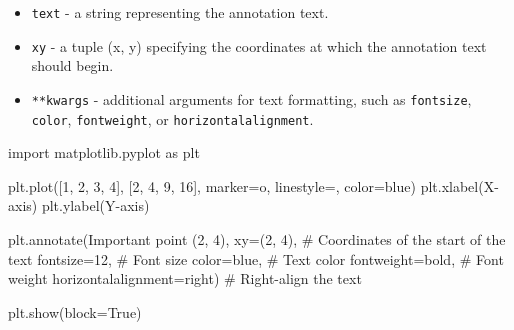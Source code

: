 \documentclass[
  english,
  letterpaper,
  DIV=11,
  numbers=noendperiod]{scrreprt}
\newenvironment{Shaded}{\begin{snugshade}}{\end{snugshade}}
\newcommand{\CommentTok}[1]{\textcolor[rgb]{0.37,0.37,0.37}{#1}}
\newcommand{\DecValTok}[1]{\textcolor[rgb]{0.68,0.00,0.00}{#1}}
\newcommand{\ImportTok}[1]{\textcolor[rgb]{0.00,0.46,0.62}{#1}}
\newcommand{\NormalTok}[1]{\textcolor[rgb]{0.00,0.23,0.31}{#1}}
\newcommand{\OperatorTok}[1]{\textcolor[rgb]{0.37,0.37,0.37}{#1}}
\newcommand{\StringTok}[1]{\textcolor[rgb]{0.13,0.47,0.30}{#1}}
\newcommand{\VariableTok}[1]{\textcolor[rgb]{0.07,0.07,0.07}{#1}}
\providecommand{\tightlist}{%
  \setlength{\itemsep}{0pt}\setlength{\parskip}{0pt}}
\begin{document}
\begin{itemize}
\tightlist
\item
  \texttt{text} - a string representing the annotation text.
\item
  \texttt{xy} - a tuple (x, y) specifying the coordinates at which the
  annotation text should begin.
\item
  \texttt{**kwargs} - additional arguments for text formatting, such as
  \texttt{fontsize}, \texttt{color}, \texttt{fontweight}, or
  \texttt{horizontalalignment}.
\end{itemize}

\begin{Shaded}
\begin{Highlighting}[]
\ImportTok{import}\NormalTok{ matplotlib.pyplot }\ImportTok{as}\NormalTok{ plt}

\NormalTok{plt.plot([}\DecValTok{1}\NormalTok{, }\DecValTok{2}\NormalTok{, }\DecValTok{3}\NormalTok{, }\DecValTok{4}\NormalTok{], [}\DecValTok{2}\NormalTok{, }\DecValTok{4}\NormalTok{, }\DecValTok{9}\NormalTok{, }\DecValTok{16}\NormalTok{], marker}\OperatorTok{=}\StringTok{\textquotesingle{}o\textquotesingle{}}\NormalTok{, linestyle}\OperatorTok{=}\StringTok{\textquotesingle{}{-}\textquotesingle{}}\NormalTok{, color}\OperatorTok{=}\StringTok{\textquotesingle{}blue\textquotesingle{}}\NormalTok{)}
\NormalTok{plt.xlabel(}\StringTok{\textquotesingle{}X{-}axis\textquotesingle{}}\NormalTok{)}
\NormalTok{plt.ylabel(}\StringTok{\textquotesingle{}Y{-}axis\textquotesingle{}}\NormalTok{)}

\NormalTok{plt.annotate(}\StringTok{\textquotesingle{}Important point (2, 4)\textquotesingle{}}\NormalTok{,}
\NormalTok{             xy}\OperatorTok{=}\NormalTok{(}\DecValTok{2}\NormalTok{, }\DecValTok{4}\NormalTok{),                           }\CommentTok{\# Coordinates of the start of the text}
\NormalTok{             fontsize}\OperatorTok{=}\DecValTok{12}\NormalTok{,                         }\CommentTok{\# Font size}
\NormalTok{             color}\OperatorTok{=}\StringTok{\textquotesingle{}blue\textquotesingle{}}\NormalTok{,                        }\CommentTok{\# Text color}
\NormalTok{             fontweight}\OperatorTok{=}\StringTok{\textquotesingle{}bold\textquotesingle{}}\NormalTok{,                   }\CommentTok{\# Font weight}
\NormalTok{             horizontalalignment}\OperatorTok{=}\StringTok{\textquotesingle{}right\textquotesingle{}}\NormalTok{)         }\CommentTok{\# Right{-}align the text}

\NormalTok{plt.show(block}\OperatorTok{=}\VariableTok{True}\NormalTok{)}
\end{Highlighting}
\end{Shaded}
\end{document}
